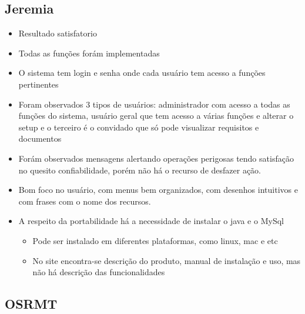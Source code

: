 \subsection{Jeremia}

  \begin{itemize}
    \item Resultado satisfatorio
    \item Todas as funções forám implementadas
    \item O sistema tem login e senha onde cada usuário tem acesso a funções pertinentes
    \item Foram observados 3 tipos de usuários: administrador com acesso a todas as funções do sistema, usuário geral
      que tem acesso a várias funções e alterar o setup e o terceiro é o convidado que só pode visualizar requisitos e
      documentos
    \item Forám observados mensagens alertando operações perigosas tendo satisfação no quesito confiabilidade, porém não
      há o recurso de desfazer ação.
    \item Bom foco no usuário, com menus bem organizados, com desenhos intuitivos e com frases com o nome dos recursos.
    \item A respeito da portabilidade há a necessidade de instalar o java e o MySql
      \begin{itemize}
        \item Pode ser instalado em diferentes plataformas, como linux, mac e etc
        \item No site encontra-se descrição do produto, manual de instalação e uso, mas não há descrição das funcionalidades
      \end{itemize}
  \end{itemize}

\subsection{OSRMT}

